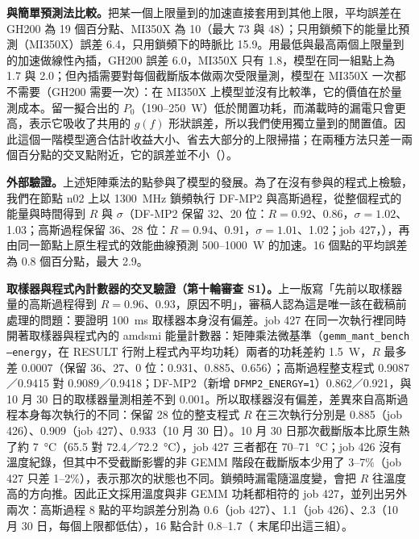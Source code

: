 \textbf{與簡單預測法比較。}把某一個上限量到的加速直接套用到其他上限，平均誤差在 GH200 為 19 個百分點、MI350X 為 10（最大 73 與 48）；只用鎖頻下的能量比預測（MI350X）誤差 6.4，只用鎖頻下的時脈比 15.9。用最低與最高兩個上限量到的加速做線性內插，GH200 誤差 6.0，MI350X 只有 1.8，模型在同一組點上為 1.7 與 2.0；但內插需要對每個截斷版本做兩次受限量測，模型在 MI350X 一次都不需要（GH200 需要一次）：在 MI350X 上模型並沒有比較準，它的價值在於量測成本。留一擬合出的 $P_0$（190–250~W）低於閒置功耗，而滿載時的漏電只會更高，表示它吸收了共用的 $g(f)$ 形狀誤差，所以我們使用獨立量到的閒置值。因此這個一階模型適合估計收益大小、省去大部分的上限掃描；在兩種方法只差一兩個百分點的交叉點附近，它的誤差並不小（）。

\textbf{外部驗證。}上述矩陣乘法的點參與了模型的發展。為了在沒有參與的程式上檢驗，我們在節點 n02 上以 1300~MHz 鎖頻執行 DF-MP2 與高斯過程，從整個程式的能量與時間得到 $R$ 與 $\sigma$（DF-MP2 保留 32、20 位：$R=0.92$、0.86，$\sigma=1.02$、1.03；高斯過程保留 36、28 位：$R=0.94$、0.91，$\sigma=1.01$、1.02；job 427，），再由同一節點上原生程式的效能曲線預測 500–1000~W 的加速。16 個點的平均誤差為 0.8 個百分點，最大 2.9。

\textbf{取樣器與程式內計數器的交叉驗證（第十輪審查 S1）。}上一版寫「先前以取樣器量的高斯過程得到 $R=0.96$、0.93，原因不明」，審稿人認為這是唯一該在截稿前處理的問題：要證明 100~ms 取樣器本身沒有偏差。job 427 在同一次執行裡同時開著取樣器與程式內的 amdsmi 能量計數器：矩陣乘法微基準（\texttt{gemm\_mant\_bench --energy}，在 RESULT 行附上程式內平均功耗）兩者的功耗差約 1.5~W，$R$ 最多差 0.0007（保留 36、27、0 位：0.931、0.885、0.656）；高斯過程整支程式 0.9087／0.9415 對 0.9089／0.9418；DF-MP2（新增 \texttt{DFMP2\_ENERGY=1}）0.862／0.921，與 10 月 30 日的取樣器量測相差不到 0.001。所以取樣器沒有偏差，差異來自高斯過程本身每次執行的不同：保留 28 位的整支程式 $R$ 在三次執行分別是 0.885（job 426）、0.909（job 427）、0.933（10 月 30 日）。10 月 30 日那次截斷版本比原生熱了約 7~°C（65.5 對 72.4／72.2~°C），job 427 三者都在 70–71~°C；job 426 沒有溫度紀錄，但其中不受截斷影響的非 GEMM 階段在截斷版本少用了 3–7\%（job 427 只差 1–2\%），表示那次的狀態也不同。鎖頻時漏電隨溫度變，會把 $R$ 往溫度高的方向推。因此正文採用溫度與非 GEMM 功耗都相符的 job 427，並列出另外兩次：高斯過程 8 點的平均誤差分別為 0.6（job 427）、1.1（job 426）、2.3（10 月 30 日，每個上限都低估），16 點合計 0.8–1.7（ 末尾印出這三組）。

